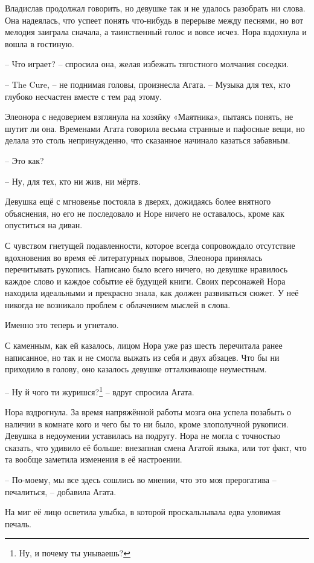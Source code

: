 \documentclass[
  a5paperpaper,
  DIV=11,
  numbers=noendperiod]{scrreprt}
\begin{document}
Владислав продолжал говорить, но девушке так и не удалось разобрать ни
слова. Она надеялась, что успеет понять что-нибудь в перерыве между
песнями, но вот мелодия заиграла сначала, а таинственный голос и вовсе
исчез. Нора вздохнула и вошла в гостиную.

-- Что играет? -- спросила она, желая избежать тягостного молчания
соседки.

-- The Cure, -- не поднимая головы, произнесла Агата. -- Музыка для тех,
кто глубоко несчастен вместе с тем рад этому.

Элеонора с недоверием взглянула на хозяйку «Маятника», пытаясь понять,
не шутит ли она. Временами Агата говорила весьма странные и пафосные
вещи, но делала это столь непринужденно, что сказанное начинало казаться
забавным.

-- Это как?

-- Ну, для тех, кто ни жив, ни мёртв.

Девушка ещё с мгновенье постояла в дверях, дожидаясь более внятного
объяснения, но его не последовало и Норе ничего не оставалось, кроме как
опуститься на диван.

С чувством гнетущей подавленности, которое всегда сопровождало
отсутствие вдохновения во время её литературных порывов, Элеонора
принялась перечитывать рукопись. Написано было всего ничего, но девушке
нравилось каждое слово и каждое событие её будущей книги. Своих
персонажей Нора находила идеальными и прекрасно знала, как должен
развиваться сюжет. У неё никогда не возникало проблем с облачением
мыслей в слова.

Именно это теперь и угнетало.

С каменным, как ей казалось, лицом Нора уже раз шесть перечитала ранее
написанное, но так и не смогла выжать из себя и двух абзацев. Что бы ни
приходило в голову, оно казалось девушке отталкивающе неуместным.

-- Ну й чого ти журишся?\footnote{Ну, и почему ты унываешь?} -- вдруг
спросила Агата.

Нора вздрогнула. За время напряжённой работы мозга она успела позабыть о
наличии в комнате кого и чего бы то ни было, кроме злополучной рукописи.
Девушка в недоумении уставилась на подругу. Нора не могла с точностью
сказать, что удивило её больше: внезапная смена Агатой языка, или тот
факт, что та вообще заметила изменения в её настроении.

-- По-моему, мы все здесь сошлись во мнении, что это моя прерогатива --
печалиться, -- добавила Агата.

На миг её лицо осветила улыбка, в которой проскальзывала едва уловимая
печаль.
\end{document}

